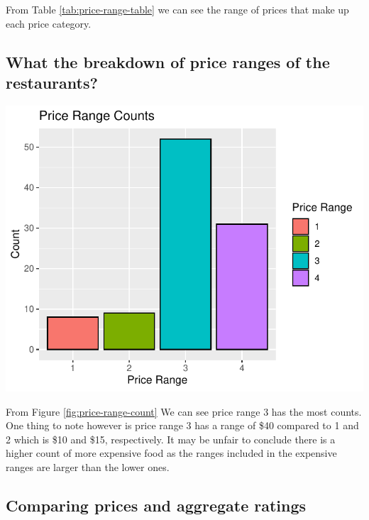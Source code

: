 \documentclass[11pt,a4paper,]{article}
\let\origfigure\figure
\let\endorigfigure\endfigure
\renewenvironment{figure}[1][2] {
    \expandafter\origfigure\expandafter[H]
} {
    \endorigfigure
}%
\begin{document}
From Table \ref{tab:price-range-table} we can see the range of prices that make up each price category.

\hypertarget{what-the-breakdown-of-price-ranges-of-the-restaurants}{%
\subsection{What the breakdown of price ranges of the restaurants?}\label{what-the-breakdown-of-price-ranges-of-the-restaurants}}

\begin{figure}
\centering
\includegraphics{assignment4_files/figure-latex/price-range-count-1.pdf}
\caption{\label{fig:price-range-count}Price Range Counts}
\end{figure}

From Figure \ref{fig:price-range-count} We can see price range 3 has the most counts. One thing to note however is price range 3 has a range of \$40 compared to 1 and 2 which is \$10 and \$15, respectively. It may be unfair to conclude there is a higher count of more expensive food as the ranges included in the expensive ranges are larger than the lower ones.

\hypertarget{comparing-prices-and-aggregate-ratings}{%
\subsection{Comparing prices and aggregate ratings}\label{comparing-prices-and-aggregate-ratings}}
\end{document}
